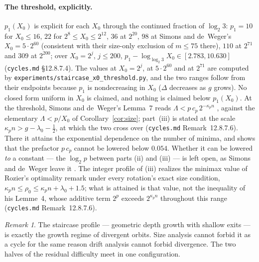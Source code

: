 \documentclass[11pt]{article}
\theoremstyle{remark}
\newtheorem{remark}[theorem]{Remark}
\newcommand{\LL}{\log_2 3}
\newcommand{\kp}{\kappa_p}
\begin{document}
\paragraph{The threshold, explicitly.} $p_1(X_0)$ is explicit for each $X_0$ through the continued fraction of $\LL$: $p_1 = 10$ for $X_0 \le 16$, $22$ for $2^8 \le X_0 \le 2^{12}$, $36$ at $2^{20}$, $98$ at Simons and de~Weger's $X_0 = 5\cdot 2^{60}$ (consistent with their size-only exclusion of $m \le 75$ there), $110$ at $2^{71}$ and $309$ at $2^{200}$; over $X_0 = 2^j$, $j \le 200$, $p_1 - \log_{\LL} X_0 \in [2.783, 10.630]$ (\texttt{cycles.md} \S12.8.7.4). The values at $X_0 = 2^j$, at $5\cdot 2^{60}$ and at $2^{71}$ are computed by \texttt{experiments/staircase\_x0\_threshold.py}, and the two ranges follow from their endpoints because $p_1$ is nondecreasing in $X_0$ ($\Delta$ decreases as $g$ grows). No closed form uniform in $X_0$ is claimed, and nothing is claimed below $p_1(X_0)$. At the threshold, Simons and de~Weger's Lemma~7 reads $\Lambda < p\,c_p\,2^{-\kp n}$ \cite[p.~58]{sdw}, against the elementary $\Lambda < p/X_0$ of Corollary~\ref{cor:size}; part~(iii) is stated at the scale $\kp n > g - \lambda_0 - \tfrac12$, at which the two cross over (\texttt{cycles.md} Remark~12.8.7.6). There it attains the exponential dependence on the number of minima, and shows that the prefactor $p\,c_p$ cannot be lowered below $0.054$. Whether it can be lowered \emph{to} a constant --- the $\log_2 p$ between parts (ii) and (iii) --- is left open, as Simons and de~Weger leave it \cite[p.~69]{sdw}. The integer profile of (iii) realizes the minimax value of Rozier's optimality remark under every rotation's exact size condition, $\kp n \le \rho_0 \le \kp n + \lambda_0 + 1.5$; what is attained is that value, not the inequality of his Lemme~4, whose additive term $2^p$ exceeds $2^{\kp n}$ throughout this range (\texttt{cycles.md} Remark~12.8.7.6).

\begin{remark}\label{rem:staircase}
The staircase profile --- geometric depth growth with shallow exits --- is exactly the growth regime of divergent orbits. Size analysis cannot forbid it as a cycle for the same reason drift analysis cannot forbid divergence. The two halves of the residual difficulty meet in one configuration.
\end{remark}
\end{document}
